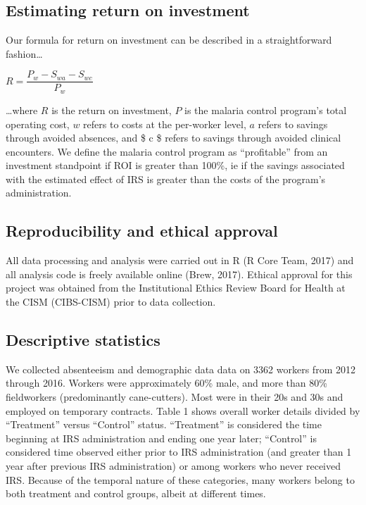 \documentclass[]{article}
\begin{document}
\subsection{Estimating return on
investment}\label{estimating-return-on-investment}

Our formula for return on investment can be described in a
straightforward fashion\ldots{}

\begin{center}
$R = \dfrac{P_{w} - S_{wa} - S_{wc}}{P_{w}}$

\end{center}

\ldots{}where \(R\) is the return on investment, \(P\) is the malaria
control program's total operating cost, \(w\) refers to costs at the
per-worker level, \(a\) refers to savings through avoided absences, and
\$ c \$ refers to savings through avoided clinical encounters. We define
the malaria control program as ``profitable'' from an investment
standpoint if ROI is greater than 100\%, ie if the savings associated
with the estimated effect of IRS is greater than the costs of the
program's administration.

\subsection{Reproducibility and ethical
approval}\label{reproducibility-and-ethical-approval}

All data processing and analysis were carried out in R (R Core Team,
2017) and all analysis code is freely available online (Brew, 2017).
Ethical approval for this project was obtained from the Institutional
Ethics Review Board for Health at the CISM (CIBS-CISM) prior to data
collection.

\subsection{Descriptive statistics}\label{descriptive-statistics}

We collected absenteeism and demographic data data on 3362 workers from
2012 through 2016. Workers were approximately 60\% male, and more than
80\% fieldworkers (predominantly cane-cutters). Most were in their 20s
and 30s and employed on temporary contracts. Table 1 shows overall
worker details divided by ``Treatment'' versus ``Control'' status.
``Treatment'' is considered the time beginning at IRS administration and
ending one year later; ``Control'' is considered time observed either
prior to IRS administration (and greater than 1 year after previous IRS
administration) or among workers who never received IRS. Because of the
temporal nature of these categories, many workers belong to both
treatment and control groups, albeit at different times.
\end{document}

